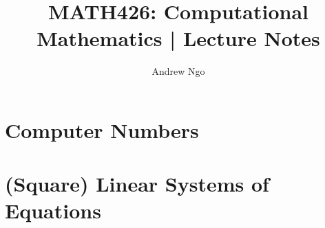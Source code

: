 \documentclass[11pt]{article}
\title{MATH426: Computational Mathematics | Lecture Notes}
\author{Andrew Ngo}
\date{}
\begin{document}
\newtheorem{lemma}{Lemma}
\newtheorem{theorem}{Theorem}
\newtheorem{definition}{Definition}
\newtheorem{corollary}{Remark}
\newtheorem{remark}{Remark}
\newtheorem{example}{Example}
\newtheorem{question}{Question}
\newenvironment{solution}{%
     \setlength\parindent{0pt}\par\medskip\textbf{Solution.}\quad}{%
     \hfill\tiny$\blacksquare$\par\medskip}
\newcommand\R{\mathbb{R}}
\newcommand\norm[1]{\lVert#1\rVert}

\maketitle

\section{Computer Numbers}
\section{(Square) Linear Systems of Equations}
\end{document}
